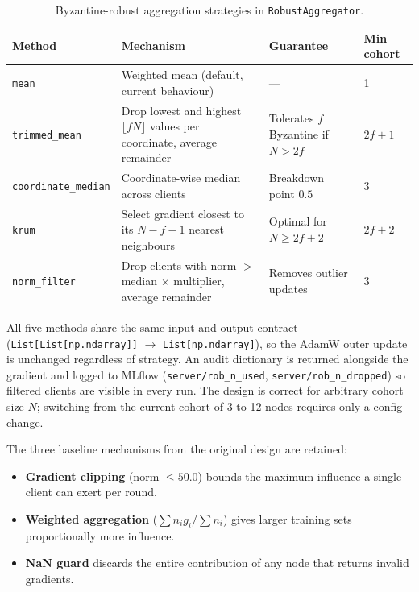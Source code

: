 \documentclass[12pt]{article}
\theoremstyle{plain}
\begin{document}
\begin{table}[H]
\centering
\caption{Byzantine-robust aggregation strategies in \texttt{RobustAggregator}.}
\label{tab:rob-methods}
\setlength{\tabcolsep}{5pt}
\begin{tabular}{p{3.2cm} p{4.8cm} p{2.2cm} p{2.0cm}}
\toprule
\textbf{Method} & \textbf{Mechanism} & \textbf{Guarantee} & \textbf{Min cohort} \\
\midrule
\texttt{mean} & Weighted mean (default, current behaviour) & — & 1 \\
\texttt{trimmed\_mean} & Drop lowest and highest $\lfloor fN \rfloor$ values per coordinate,
  average remainder & Tolerates $f$ Byzantine if $N > 2f$ & $2f+1$ \\
\texttt{coordinate\_median} & Coordinate-wise median across clients & Breakdown point $0.5$ & 3 \\
\texttt{krum} & Select gradient closest to its $N{-}f{-}1$ nearest neighbours & Optimal for $N \geq 2f+2$ & $2f+2$ \\
\texttt{norm\_filter} & Drop clients with norm $>$ median$\,\times\,$multiplier, average remainder & Removes outlier updates & 3 \\
\bottomrule
\end{tabular}
\end{table}

All five methods share the same input and output contract
(\texttt{List[List[np.ndarray]]} $\rightarrow$ \texttt{List[np.ndarray]}),
so the AdamW outer update is unchanged regardless of strategy.
An audit dictionary is returned alongside the gradient and logged to MLflow
(\texttt{server/rob\_n\_used}, \texttt{server/rob\_n\_dropped}) so filtered
clients are visible in every run.
The design is correct for arbitrary cohort size $N$; switching from the current
cohort of 3 to 12 nodes requires only a config change.

The three baseline mechanisms from the original design are retained:

\begin{itemize}
  \item \textbf{Gradient clipping} (norm $\leq 50.0$) bounds the maximum influence
        a single client can exert per round.
  \item \textbf{Weighted aggregation} ($\sum n_i g_i / \sum n_i$) gives larger
        training sets proportionally more influence.
  \item \textbf{NaN guard} discards the entire contribution of any node that
        returns invalid gradients.
\end{itemize}
\end{document}
